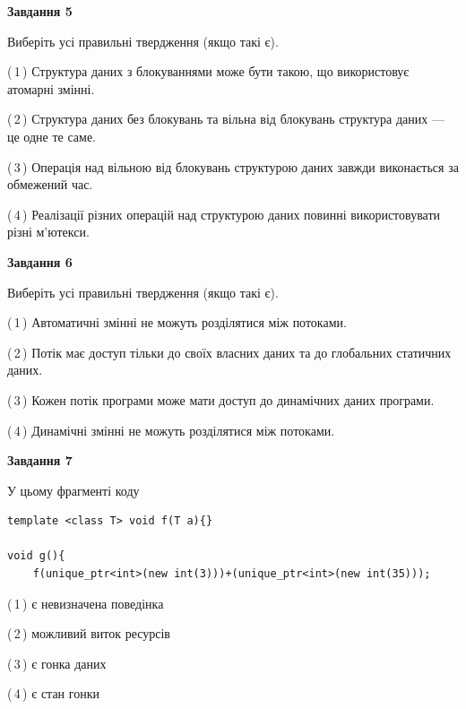 \documentclass[12pt, ukrainian]{article}
\begin{document}
\begin {large}
{\begin{center}
\textbf{Завдання 5}
\end{center}

Виберіть усі правильні твердження (якщо такі є).\par
\vspace{2mm}

(\,1\,) Структура даних з блокуваннями може бути такою, що використовує атомарні змінні.%

(\,2\,) Структура даних без блокувань та вільна від блокувань структура даних --- це одне те саме.%

(\,3\,) Операція над вільною від блокувань структурою даних завжди виконається за обмежений час.%

(\,4\,) Реалізації різних операцій над структурою даних повинні використовувати різні м’ютекси.%
\newpage


\begin{center}
\textbf{Завдання 6}
\end{center}

Виберіть усі правильні твердження (якщо такі є).\par
\vspace{2mm}

(\,1\,) Автоматичні змінні не можуть розділятися між потоками.%

(\,2\,) Потік має доступ тільки до своїх власних даних та до глобальних статичних даних.%

(\,3\,) Кожен потік програми може мати доступ до динамічних даних програми.%

(\,4\,) Динамічні змінні не можуть розділятися між потоками.%


\begin{center}
\textbf{Завдання 7}
\end{center}

У цьому фрагменті коду
\begin{verbatim}
template <class T> void f(T a){}

void g(){
    f(unique_ptr<int>(new int(3)))+(unique_ptr<int>(new int(35)));
\end{verbatim}

(\,1\,) є невизначена поведінка%

(\,2\,) можливий виток ресурсів%

(\,3\,) є гонка даних%

(\,4\,) є стан гонки%

}
\end {large}

\vspace{4mm}
\newpage
\end{document}
